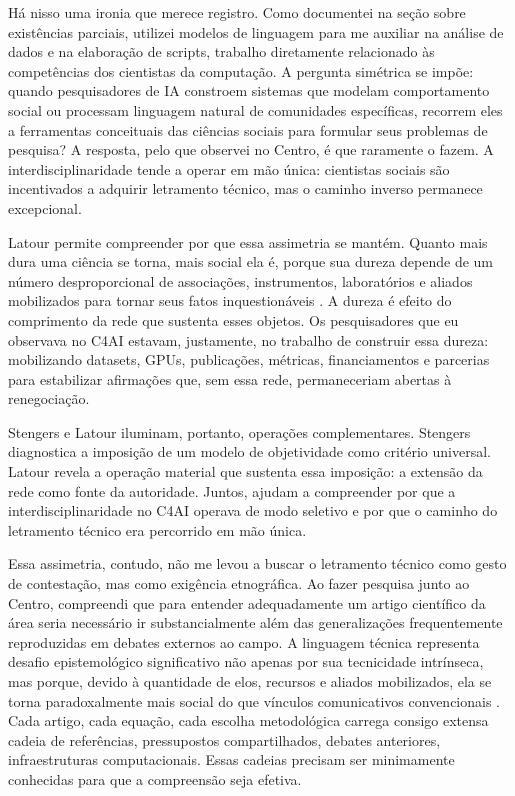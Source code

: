 Há nisso uma ironia que merece registro. Como documentei na seção sobre existências parciais, utilizei modelos de linguagem para me auxiliar na análise de dados e na elaboração de scripts, trabalho diretamente relacionado às competências dos cientistas da computação. A pergunta simétrica se impõe: quando pesquisadores de IA constroem sistemas que modelam comportamento social ou processam linguagem natural de comunidades específicas, recorrem eles a ferramentas conceituais das ciências sociais para formular seus problemas de pesquisa? A resposta, pelo que observei no Centro, é que raramente o fazem. A interdisciplinaridade tende a operar em mão única: cientistas sociais são incentivados a adquirir letramento técnico, mas o caminho inverso permanece excepcional.

Latour permite compreender por que essa assimetria se mantém. Quanto mais dura uma ciência se torna, mais social ela é, porque sua dureza depende de um número desproporcional de associações, instrumentos, laboratórios e aliados mobilizados para tornar seus fatos inquestionáveis \parencite{Latour2011CienciaEmAcao}. A dureza é efeito do comprimento da rede que sustenta esses objetos. Os pesquisadores que eu observava no C4AI estavam, justamente, no trabalho de construir essa dureza: mobilizando datasets, GPUs, publicações, métricas, financiamentos e parcerias para estabilizar afirmações que, sem essa rede, permaneceriam abertas à renegociação.

Stengers e Latour iluminam, portanto, operações complementares. Stengers diagnostica a imposição de um modelo de objetividade como critério universal. Latour revela a operação material que sustenta essa imposição: a extensão da rede como fonte da autoridade. Juntos, ajudam a compreender por que a interdisciplinaridade no C4AI operava de modo seletivo e por que o caminho do letramento técnico era percorrido em mão única.

Essa assimetria, contudo, não me levou a buscar o letramento técnico como gesto de contestação, mas como exigência etnográfica. Ao fazer pesquisa junto ao Centro, compreendi que para entender adequadamente um artigo científico da área seria necessário ir substancialmente além das generalizações frequentemente reproduzidas em debates externos ao campo. A linguagem técnica representa desafio epistemológico significativo não apenas por sua tecnicidade intrínseca, mas porque, devido à quantidade de elos, recursos e aliados mobilizados, ela se torna paradoxalmente mais social do que vínculos comunicativos convencionais \parencite{Latour2011CienciaEmAcao}. Cada artigo, cada equação, cada escolha metodológica carrega consigo extensa cadeia de referências, pressupostos compartilhados, debates anteriores, infraestruturas computacionais. Essas cadeias precisam ser minimamente conhecidas para que a compreensão seja efetiva.

